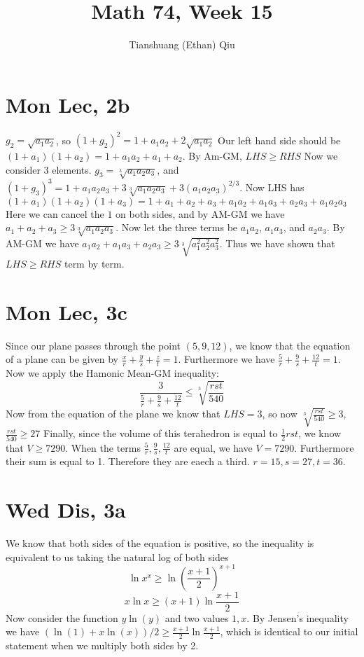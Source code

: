 \documentclass[12pt]{article}
\author{Tianshuang (Ethan) Qiu}
\begin{document}
\title{Math 74, Week 15}
\maketitle

\section{Mon Lec, 2b}
$g_2 = \sqrt{a_1a_2}$, so $(1+g_2)^2 = 1 + a_1a_2 + 2\sqrt{a_1a_2}$
\newline
Our left hand side should be $(1+a_1)(1+a_2) = 1 + a_1a_2 + a_1 + a_2$. By Am-GM, $LHS \geq RHS$
\newline
Now we consider 3 elements. $g_3 = \sqrt[3]{a_1a_2a_3}$, and $(1+g_3)^3 = 1 + a_1a_2a_3 + 3\sqrt[3]{a_1a_2a_3} + 3(a_1a_2a_3)^{2/3}$.
\newline
Now LHS has $(1+a_1)(1+a_2)(1+a_3) = 1 + a_1 + a_2 + a_3 + a_1a_2 + a_1a_3 + a_2a_3 + a_1a_2a_3 $
Here we can cancel the $1$ on both sides, and by AM-GM we have $a_1+a_2+a_3 \geq 3\sqrt[3]{a_1a_2a_3}$. Now let the three terms be $a_1a_2$, $ a_1a_3$, and $ a_2a_3$. By AM-GM we have $a_1a_2 + a_1a_3 + a_2a_3 \geq 3 \sqrt[3]{a_1^2a_2^2a_3^2}$.
\newline
Thus we have shown that $LHS \geq RHS$ term by term.


\section{Mon Lec, 3c}
Since our plane passes through the point $(5,9,12)$, we know that the equation of a plane can be given by $\frac{x}{r} +
\frac{y}{s} + \frac{z}{t} = 1$.
Furthermore we have $\frac{5}{r} + \frac{9}{s} + \frac{12}{t} = 1$. Now we apply the Hamonic Mean-GM inequality:
$$\frac{3}{\frac{5}{r} + \frac{9}{s} + \frac{12}{t}} \leq \sqrt[3]{\frac{rst}{540}}$$
Now from the equation of the plane we know that $LHS = 3$, so now $\sqrt[3]{\frac{rst}{540}} \geq 3$, $\frac{rst}{540} \geq 27$
Finally, since the volume of this terahedron is equal to $\frac{1}{2}rst$, we know that $V \geq 7290$.
\newline
When the terms $\frac{5}{r}, \frac{9}{s},\frac{12}{t}$ are equal, we have $V = 7290$. Furthermore their sum is equal to 1. Therefore they are eaech a third. $r = 15, s = 27, t = 36$.


\section{Wed Dis, 3a}
We know that both sides of the equation is positive, so the inequality is equivalent to us taking the natural log of both sides
$$\ln{x^x} \geq \ln{(\frac{x+1}{2})^{x+1}}$$
$$x \ln{x} \geq (x+1)\ln{\frac{x+1}{2}}$$
Now consider the function $y\ln(y)$ and two values $1, x$. By Jensen's inequality we have $(\ln(1)+x\ln(x))/2 \geq \frac{x+1}{2}\ln\frac{x+1}{2}$, which is identical to our initial statement when we multiply both sides by 2.
\end{document}

